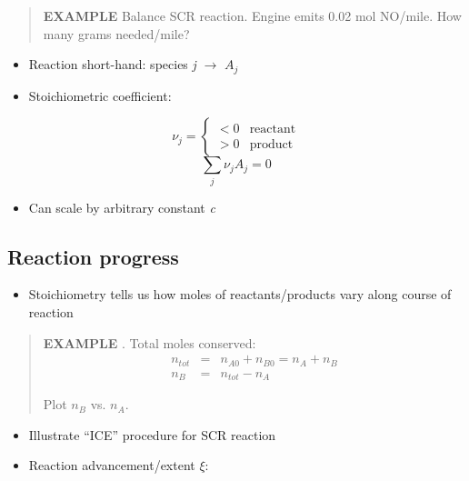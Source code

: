 \documentclass[11pt]{article}
\begin{document}
\begin{quote}
\hline
\textbf{EXAMPLE} Balance SCR reaction.  Engine emits 0.02 mol NO/mile.  How many grams  needed/mile?

\hline
\end{quote}


\begin{itemize}
\item Reaction short-hand: species \emph{j} $\to$ \(A_{j}\)
\item Stoichiometric coefficient:
\end{itemize}

\begin{equation*}
\nu_{j}= \left\{
\begin{array}{rl}
< 0 & \text{reactant}\\
> 0 & \text{product}
\end{array}
\end{equation*}
\begin{equation*}
\sum_{j} \nu_{j} A_{j} = 0
\end{equation*}

\begin{itemize}
\item Can scale by arbitrary constant \emph{c}
\end{itemize}
\subsection{Reaction progress}
\label{sec-6-3}
\begin{itemize}
\item Stoichiometry tells us how moles of reactants/products vary along course of reaction
\end{itemize}

\begin{quote}
\textbf{EXAMPLE} .  Total moles conserved:
\begin{eqnarray*}
n_{tot} & = & n_{A0} + n_{B0} = n_{A} + n_{B}\\
n_{B} & = & n_{tot} - n_{A}
\end{eqnarray*}

Plot \(n_{B}\) vs. \(n_{A}\).
\end{quote}

\begin{itemize}
\item Illustrate ``ICE'' procedure for SCR reaction
\item Reaction advancement/extent $\xi$:
\end{itemize}
\end{document}
